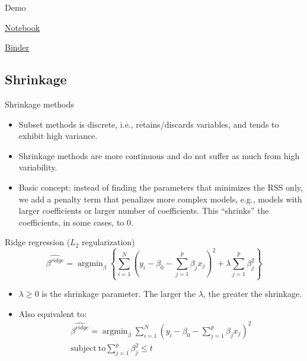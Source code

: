 \documentclass{beamer}
\DeclareMathOperator*{\argmin}{argmin}
\begin{document}
\begin{frame}{Demo}
    \centerline{\href{https://github.com/materialsvirtuallab/nano281/tree/master/lectures}{Notebook}}
    \centerline{\href{https://mybinder.org/v2/gh/materialsvirtuallab/nano281/master?filepath=lectures}{Binder}}
\end{frame} 


\subsection{Shrinkage}

\begin{frame}{Shrinkage methods}
    \begin{itemize}
        \item Subset methods is discrete, i.e., retains/discards variables, and tends to exhibit high variance.
        \item Shrinkage methods are more continuous and do not suffer as much from high variability.
        \item Basic concept: instead of finding the parameters that minimizes the RSS only, we add a penalty term that penalizes more complex models, e.g., models with larger coefficients or larger number of coefficients. This ``shrinks'' the coefficients, in some cases, to 0.
    \end{itemize}
\end{frame}


\begin{frame}{Ridge regression ($L_2$ regularization)}
    \begin{equation*}
        \hat{\beta^{ridge}} = \argmin_\beta \left \{ \sum_{i=1}^N (y_i - \beta_0 - \sum_{j=1}^p \beta_j x_j)^2 + \lambda \sum_{j=1}^p \beta_j^2 \right \}
    \end{equation*}
    \begin{itemize}
        \item $\lambda \geq 0$ is the shrinkage parameter. The larger the $\lambda$, the greater the shrinkage.
        \item Also equivalent to:
        \begin{eqnarray*}
        \hat{\beta^{ridge}} = \argmin_\beta \sum_{i=1}^N (y_i - \beta_0 - \sum_{j=1}^p \beta_j x_j)^2\\
        \mathrm{subject~to} \sum_{j=1}^p \beta_j^2 \leq t
        \end{eqnarray*}
    \end{itemize}
\end{frame}
\end{document}
